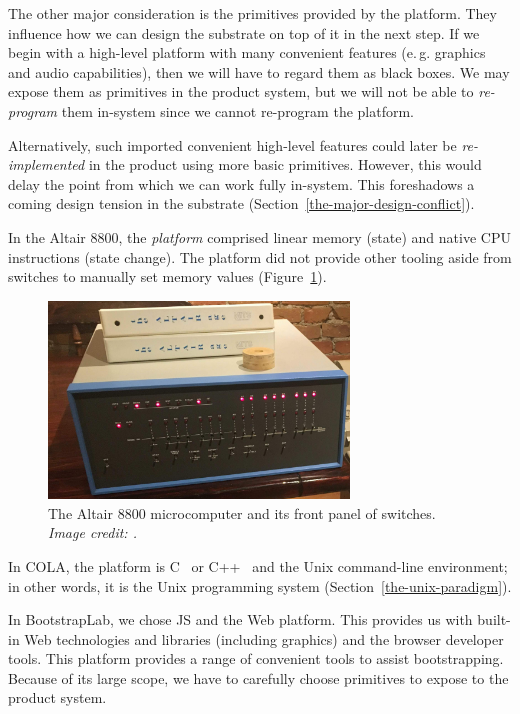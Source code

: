 \documentclass[ twoside,openright,titlepage,numbers=noenddot,headinclude,footinclude,cleardoublepage=empty,abstract=on,
                BCOR=5mm,paper=a4,fontsize=11pt
                ]{scrreprt}
\newcommand{\eg}{e.\,g.}
\theoremstyle{definition}
\begin{document}
The other major consideration is the primitives provided by the
platform. They influence how we can design the substrate on top of it in
the next step. If we begin with a high-level platform with many
convenient features (\eg{} graphics and audio capabilities), then we
will have to regard them as black boxes. We may expose them as
primitives in the product system, but we will not be able to
\emph{re-program} them in-system since we cannot re-program the
platform.

Alternatively, such imported convenient high-level features could later
be \emph{re-implemented} in the product using more basic primitives.
However, this would delay the point from which we can work fully
in-system. This foreshadows a coming design tension in the substrate
(Section~\ref{the-major-design-conflict}).

In the Altair 8800, the \emph{platform} comprised linear memory (state)
and native CPU instructions (state change). The platform did not provide
other tooling aside from switches to manually set memory values
(Figure~\ref{fig:altair}).

\begin{figure}
\centering
\includegraphics[width=8cm]{Altair-8800.jpg}
\caption[The Altair 8800 microcomputer]{The Altair 8800 microcomputer and its front panel of switches. \emph{Image credit: \parencite{Altair}.}}
\label{fig:altair}
\end{figure}

In \ac{COLA}, the platform is C~\parencite{OROM} or
C++~\parencite{COLAs} and the Unix command-line environment; in other
words, it is the Unix programming system
(Section~\ref{the-unix-paradigm}).

In BootstrapLab, we chose \ac{JS} and the Web platform. This provides us
with built-in Web technologies and libraries (including graphics) and
the browser developer tools. This platform provides a range of
convenient tools to assist bootstrapping. Because of its large scope, we
have to carefully choose primitives to expose to the product system.
\end{document}
